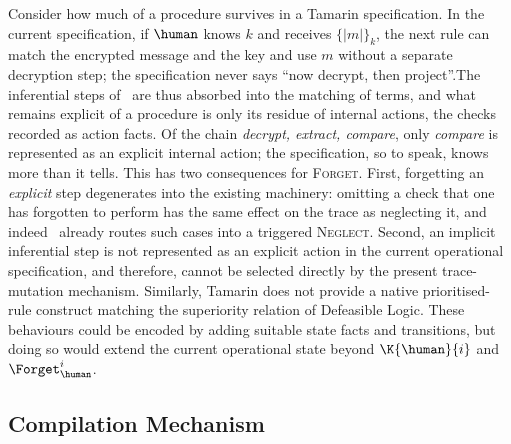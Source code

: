 Consider how much of a procedure survives in a Tamarin specification. In the current \XMen{} specification, if $\human$ knows $k$ and receives $\{\!|m|\!\}_k$, the next rule can match the encrypted message and the key and use $m$ without a separate decryption step; the specification never says ``now decrypt, then project''.The inferential steps of~ are thus absorbed into the matching of terms, and what remains explicit of a procedure is only its residue of internal actions, the checks recorded as action facts. Of the chain \emph{decrypt, extract, compare}, only \emph{compare} is represented as an explicit internal action; the specification, so to speak, knows more than it tells. This has two consequences for \textsc{Forget}. First, forgetting an \emph{explicit} step degenerates into the existing machinery: omitting a check that one has forgotten to perform has the same effect on the trace as neglecting it, 
and indeed~ already routes such cases into a triggered \textsc{Neglect}. Second, an implicit inferential step is not represented as an explicit action in the current operational specification, and therefore, cannot be selected directly by the present trace-mutation mechanism. Similarly, Tamarin does not provide a native prioritised-rule construct matching the superiority relation of Defeasible Logic. These behaviours could be encoded by adding suitable state facts and transitions, but doing so would extend the current operational state beyond $\K{\human}{i}$ and $\Forget_{\human}^{i}$.

\subsection{Compilation Mechanism}

